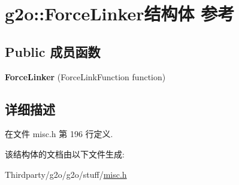 \hypertarget{structg2o_1_1ForceLinker}{\section{g2o\-:\-:Force\-Linker结构体 参考}
\label{structg2o_1_1ForceLinker}
}
\subsection*{Public 成员函数}
\begin{DoxyCompactItemize}
\item 
\hypertarget{structg2o_1_1ForceLinker_ae5489ea8966a1d1f62471075f1dd2524}{{\bfseries Force\-Linker} (Force\-Link\-Function function)}\label{structg2o_1_1ForceLinker_ae5489ea8966a1d1f62471075f1dd2524}

\end{DoxyCompactItemize}


\subsection{详细描述}


在文件 misc.\-h 第 196 行定义.



该结构体的文档由以下文件生成\-:\begin{DoxyCompactItemize}
\item 
Thirdparty/g2o/g2o/stuff/\hyperlink{misc_8h}{misc.\-h}\end{DoxyCompactItemize}
